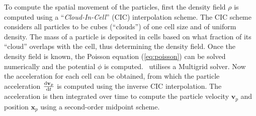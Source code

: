 To compute the spatial movement of the particles, first the density field $\rho$ is computed using a ``\emph{Cloud-In-Cell}'' (CIC) interpolation scheme.
The CIC scheme considers all particles to be cubes (``clouds'') of one cell size and of uniform density. 
The mass of a particle is deposited in cells based on what fraction of its ``cloud'' overlaps with the cell, thus determining the density field.
Once the density field is known, the Poisson equation (\ref{eq:poisson}) can be solved numerically and the potential $\phi$ is computed.
\ramses\ utilises a Multigrid solver.
Now the acceleration for each cell can be obtained, from which the particle acceleration $\tfrac {\mathrm{d}\mathbf{v}_p}{\mathrm{d} t}$ is computed using the inverse CIC interpolation. 
The acceleration is then integrated over time to compute the particle velocity $\mathbf{v}_p$ and position $\mathbf{x}_p$ using a second-order midpoint scheme.




































